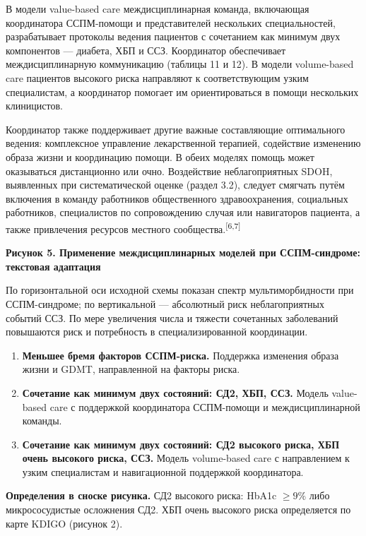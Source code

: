 \documentclass[11pt,a4paper]{article}
\newcommand{\src}[1]{\textsuperscript{[#1]}}
\newcommand{\heading}[1]{\par\medskip\textbf{#1}\par}
\begin{document}
В модели value-based care междисциплинарная команда, включающая координатора ССПМ-помощи и представителей нескольких специальностей, разрабатывает протоколы ведения пациентов с сочетанием как минимум двух компонентов --- диабета, ХБП и ССЗ. Координатор обеспечивает междисциплинарную коммуникацию (таблицы 11 и 12). В модели volume-based care пациентов высокого риска направляют к соответствующим узким специалистам, а координатор помогает им ориентироваться в помощи нескольких клиницистов.

Координатор также поддерживает другие важные составляющие оптимального ведения: комплексное управление лекарственной терапией, содействие изменению образа жизни и координацию помощи. В обеих моделях помощь может оказываться дистанционно или очно. Воздействие неблагоприятных SDOH, выявленных при систематической оценке (раздел 3.2), следует смягчать путём включения в команду работников общественного здравоохранения, социальных работников, специалистов по сопровождению случая или навигаторов пациента, а также привлечения ресурсов местного сообщества.\src{6,7}

\heading{Рисунок 5. Применение междисциплинарных моделей при ССПМ-синдроме: текстовая адаптация}
По горизонтальной оси исходной схемы показан спектр мультиморбидности при ССПМ-синдроме; по вертикальной --- абсолютный риск неблагоприятных событий ССЗ. По мере увеличения числа и тяжести сочетанных заболеваний повышаются риск и потребность в специализированной координации.
\begin{enumerate}[label=\arabic*.]
\item \textbf{Меньшее бремя факторов ССПМ-риска.} Поддержка изменения образа жизни и GDMT, направленной на факторы риска.
\item \textbf{Сочетание как минимум двух состояний: СД2, ХБП, ССЗ.} Модель value-based care с поддержкой координатора ССПМ-помощи и междисциплинарной команды.
\item \textbf{Сочетание как минимум двух состояний: СД2 высокого риска, ХБП очень высокого риска, ССЗ.} Модель volume-based care с направлением к узким специалистам и навигационной поддержкой координатора.
\end{enumerate}
\textbf{Определения в сноске рисунка.} СД2 высокого риска: HbA1c $\geq9\%$ либо микрососудистые осложнения СД2. ХБП очень высокого риска определяется по карте KDIGO (рисунок 2).
\end{document}
